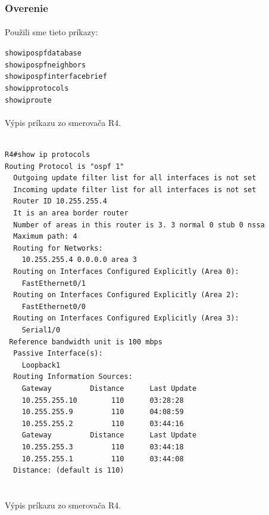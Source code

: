 \documentclass[12pt,twoside,a4paper]{report}
\begin{document}
\subsubsection{Overenie}
\paragraph{}
Použili sme tieto príkazy:

\noindent
{\selectfont
\begin{small}
\begin{alltt}

show ip ospf database
show ip ospf neighbors
show ip ospf interface brief
show ip protocols
show ip route

\end{alltt}
\end{small}
}


\paragraph{}
Výpis príkazu  zo smerovača R4.


\noindent
{\selectfont
\begin{small}
\begin{verbatim}

R4#show ip protocols
Routing Protocol is "ospf 1"
  Outgoing update filter list for all interfaces is not set
  Incoming update filter list for all interfaces is not set
  Router ID 10.255.255.4
  It is an area border router
  Number of areas in this router is 3. 3 normal 0 stub 0 nssa
  Maximum path: 4
  Routing for Networks:
    10.255.255.4 0.0.0.0 area 3
  Routing on Interfaces Configured Explicitly (Area 0):
    FastEthernet0/1
  Routing on Interfaces Configured Explicitly (Area 2):
    FastEthernet0/0
  Routing on Interfaces Configured Explicitly (Area 3):
    Serial1/0
 Reference bandwidth unit is 100 mbps
  Passive Interface(s):
    Loopback1
  Routing Information Sources:
    Gateway         Distance      Last Update
    10.255.255.10        110      03:28:28
    10.255.255.9         110      04:08:59
    10.255.255.2         110      03:44:16
    Gateway         Distance      Last Update
    10.255.255.3         110      03:44:18
    10.255.255.1         110      03:44:08
  Distance: (default is 110)


\end{verbatim}
\end{small}
}


\paragraph{}
Výpis príkazu  zo smerovača R4.
\end{document}
